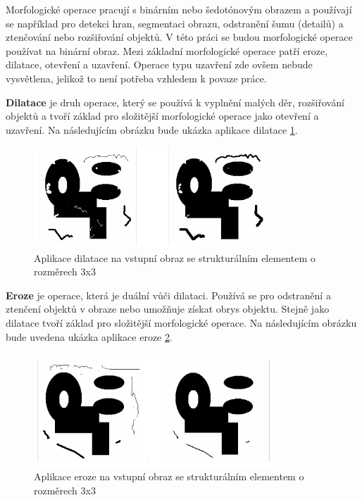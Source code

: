 Morfologické operace pracují s binárním nebo šedotónovým obrazem a používají se například pro detekci hran, segmentaci obrazu, odstranění šumu (detailů) a ztenčování nebo rozšiřování objektů. V této práci se budou morfologické operace používat na binární obraz. Mezi základní morfologické operace patří eroze, dilatace, otevření a uzavření. Operace typu uzavření zde ovšem nebude vysvětlena, jelikož to není potřeba vzhledem k povaze práce. 

\textbf{Dilatace} je druh operace, který se používá k vyplnění malých děr, rozšiřování objektů a tvoří základ pro složitější morfologické operace jako otevření a uzavření. Na následujícím obrázku bude ukázka aplikace dilatace \ref{aplikace_dilatace}.

\begin{figure}[h]
	\centering
	\includegraphics[width=0.8\textwidth]{obrazky/dilatace.png}
	\caption{Aplikace dilatace na vstupní obraz se strukturálním elementem o rozměrech 3x3 \cite{morfologie}}
	\label{aplikace_dilatace}
\end{figure}

\textbf{Eroze} je operace, která je duální vůči dilataci. Používá se pro odstranění a ztenčení objektů v obraze nebo umožňuje získat obrys objektu. Stejně jako dilatace tvoří základ pro složitější morfologické operace. Na následujícím obrázku bude uvedena ukázka aplikace eroze \ref{aplikace_eroze}.


\newpage
\begin{figure}[h]
	\centering
	\includegraphics[width=0.8\textwidth]{obrazky/eroze.png}
	\caption{Aplikace eroze na vstupní obraz se strukturálním elementem o rozměrech 3x3 \cite{morfologie}}
	\label{aplikace_eroze}
\end{figure}

